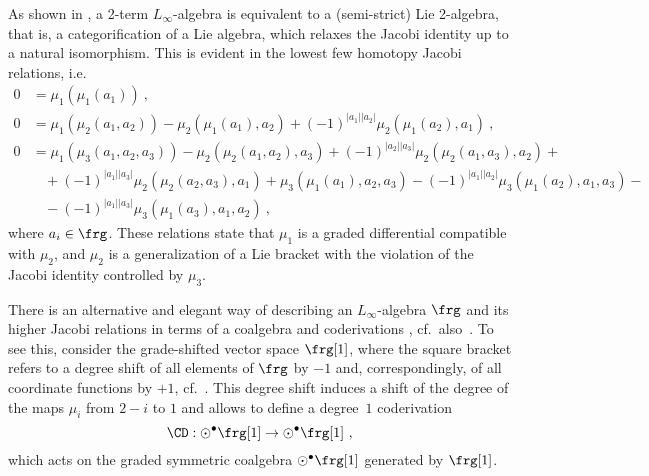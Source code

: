 \documentclass[reqno,a4paper,11pt]{article}
\begin{document}
As shown in \cite{Baez:2003aa}, a 2-term $L_\infty$-algebra is equivalent to a (semi-strict) Lie 2-algebra, that is, a categorification of a Lie algebra, which relaxes the Jacobi identity up to a natural isomorphism. This is evident in the lowest few homotopy Jacobi relations, i.e.
\begin{equation}\label{eq:hJacobi_Lie_2}
\begin{aligned}
0&=\mu_1\left(\mu_1\left(a_1\right)\right)~,\\
0&= \mu_1\left(\mu_2\left(a_1,a_2\right)\right)-
\mu_2\left(\mu_1\left(a_1\right),a_2\right)+
(-1)^{\left| a_1\right|  \left| a_2\right| } \mu_2\left(\mu_1\left(a_2\right),a_1\right)~,\\
0 &=\mu_1\left(\mu_3\left(a_1,a_2,a_3\right)\right)-\mu_2\left(\mu_2\left(a_1,a_2\right),a_3\right)+(-1)^{|a_2| |a_3|} \mu_2(\mu_2(a_1,a_3),a_2)+\\
&~~~~+(-1)^{|a_1| |a_3|} \mu_2(\mu_2(a_2,a_3),a_1)+
\mu_3(\mu_1(a_1),a_2,a_3)-
(-1)^{|a_1| |a_2|} \mu_3(\mu_1(a_2),a_1,a_3)-\\
&~~~~-
(-1)^{|a_1| |a_3|} \mu_3(\mu_1(a_3),a_1,a_2)~,
\end{aligned}
\end{equation}
where $a_i \in \frg$. These relations state that $\mu_1$ is a graded differential compatible with $\mu_2$, and $\mu_2$ is a generalization of a Lie bracket with the violation of the Jacobi identity controlled by $\mu_3$.

There is an alternative and elegant way of describing an $L_\infty$-algebra $\frg$ and its higher Jacobi relations in terms of a coalgebra and coderivations \cite{Lada:1992wc}, cf.~also~\cite{Lada:1994mn}. To see this, consider the grade-shifted vector space $\frg[1]$, where the square bracket refers to a degree shift of all elements of $\frg$ by $-1$ and, correspondingly, of all coordinate functions by $+1$, cf.~\cite{Jurco:2018sby}. This degree shift induces a shift of the degree of the maps $\mu_i$ from $2-i$ to $1$ and allows to define a degree~$1$ coderivation
\begin{equation}
\CD:\odot^\bullet \frg[1]\to\odot^\bullet \frg[1]~,
\end{equation}
which acts on the graded symmetric coalgebra $\odot^\bullet \frg[1]$ generated by $\frg[1]$. 
\end{document}
